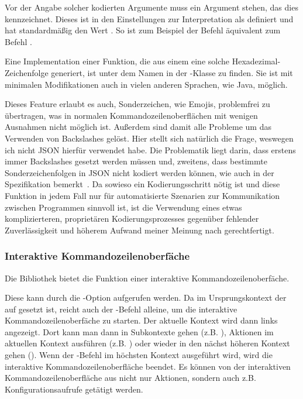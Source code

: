 Vor der Angabe solcher kodierten Argumente muss ein Argument stehen, das dies kennzeichnet.
Dieses ist in den Einstellungen zur Interpretation als  definiert und hat standardmäßig den Wert .
So ist zum Beispiel der Befehl  äquivalent zum Befehl .

Eine Implementation einer Funktion, die aus einem  eine solche Hexadezimal-Zeichenfolge generiert, ist unter dem Namen  in der -Klasse zu finden.
Sie ist mit minimalen Modifikationen auch in vielen anderen Sprachen, wie Java, möglich.

Dieses Feature erlaubt es auch, Sonderzeichen, wie Emojis, problemfrei zu übertragen, was in normalen Kommandozeilenoberflächen mit wenigen Ausnahmen nicht möglich ist.
Außerdem sind damit alle Probleme um das Verwenden von Backslashes gelöst.
Hier stellt sich natürlich die Frage, weswegen ich nicht JSON hierfür verwendet habe.
Die Problematik liegt darin, dass erstens immer Backslashes gesetzt werden müssen und, zweitens, dass bestimmte Sonderzeichenfolgen in JSON nicht kodiert werden können, wie auch in der Spezifikation bemerkt~\cite{JSONSpec}.
Da sowieso ein Kodierungsschritt nötig ist und diese Funktion in jedem Fall nur für automatisierte Szenarien zur Kommunikation zwischen Programmen sinnvoll ist,
ist die Verwendung eines etwas komplizierteren, proprietären Kodierungsprozesses gegenüber fehlender Zuverlässigkeit und höherem Aufwand meiner Meinung nach gerechtfertigt.
\subsubsection{Interaktive Kommandozeilenoberfäche}
Die Bibliothek bietet die Funktion einer interaktive Kommandozeilenoberfäche.

Diese kann durch die -Option aufgerufen werden.
Da im Ursprungskontext der  auf  gesetzt ist,
reicht auch der -Befehl alleine, um die interaktive Kommandozeilenoberfäche zu starten.
Der aktuelle Kontext wird dann links angezeigt.
Dort kann man dann in Subkontexte gehen (z.B. ), Aktionen im aktuellen Kontext ausführen (z.B. )
oder wieder in den nächst höheren Kontext gehen ().
Wenn der -Befehl im höchsten Kontext ausgeführt wird, wird die interaktive Kommandozeilenoberfläche beendet.
Es können von der interaktiven Kommandozeilenoberfläche aus nicht nur Aktionen, sondern auch z.B. Konfigurationsaufrufe getätigt werden.

